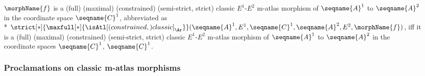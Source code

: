\documentclass{article}
\begin{document}
\begin{definition}
$\morphName{f}$ is a (full) (maximal) (constrained) (semi-strict, strict)
classic $E^1$-$E^2$ m-atlas morphism of $\seqname{A}^1$ to
$\seqname{A}^2$ in the coordinate space $\seqname{C}^1$, abbreviated
as \\*
$
  \strict[*]{\maxfull[*]{\isAtl[(constrained,)classic]_\Ar}}
  (
    \seqname{A}^1,
    E^1,
    \seqname{C}^1,
    \seqname{A}^2,
    E^2,
    \morphName{f}
  )
$,
iff it is a (full) (maximal) (constrained) (semi-strict, strict) classic
$E^1$-$E^2$ m-atlas morphism of $\seqname{A}^1$ to $\seqname{A}^2$ in
the coordinate spaces $\seqname{C}^1$, $\seqname{C}^1$.
\end{definition}

\subsubsection{Proclamations on classic m-atlas morphisms}
\end{document}
